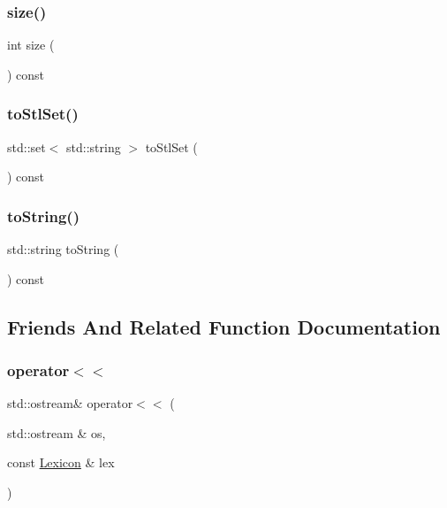 \subsubsection{\texorpdfstring{size()}{size()}}
{\footnotesize\ttfamily int size (\begin{DoxyParamCaption}{ }\end{DoxyParamCaption}) const}

\mbox{\label{classLexicon_a56b9ca7800c467295cab333fd9815291}} 
\subsubsection{\texorpdfstring{to\+Stl\+Set()}{toStlSet()}}
{\footnotesize\ttfamily std\+::set$<$ std\+::string $>$ to\+Stl\+Set (\begin{DoxyParamCaption}{ }\end{DoxyParamCaption}) const}

\mbox{\label{classLexicon_a1fe5121d6528fdea3f243321b3fa3a49}} 
\subsubsection{\texorpdfstring{to\+String()}{toString()}}
{\footnotesize\ttfamily std\+::string to\+String (\begin{DoxyParamCaption}{ }\end{DoxyParamCaption}) const}



\subsection{Friends And Related Function Documentation}
\mbox{\label{classLexicon_af4dde954854b1ec1072266b3042d44a6}} 
\subsubsection{\texorpdfstring{operator$<$$<$}{operator<<}}
{\footnotesize\ttfamily std\+::ostream\& operator$<$$<$ (\begin{DoxyParamCaption}\item[{std\+::ostream \&}]{os,  }\item[{const \mbox{\hyperlink{classLexicon}{Lexicon}} \&}]{lex }\end{DoxyParamCaption})\hspace{0.3cm}{\ttfamily [friend]}}

